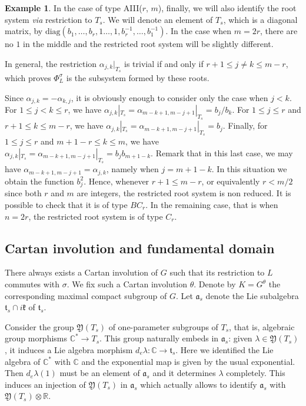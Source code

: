 \documentclass{amsart}
\theoremstyle{definition}
\newtheorem{exa}[thm]{Example}
\begin{document}
\begin{exa}
\label{exa_restricted_AIII}
In the case of type AIII($r$, $m$), finally, we will also identify the root system \emph{via}
restriction to $T_s$. We will denote an element of $T_s$, which is a diagonal matrix,  
by $\mathrm{diag}(b_1,\ldots,b_r, 1\ldots,1, b_r^{-1},\ldots,b_1^{-1})$.
In the case when $m=2r$, there are no $1$ in the middle and the restricted 
root system will be slightly different.

In general, the restriction $\alpha_{j,k}|_{T_s}$ is trivial if and only 
if $r+1\leq j\neq k\leq m-r$, which proves 
$\Phi_L^{\sigma}$ is the subsystem formed by these roots.

Since $\alpha_{j,k}=-\alpha_{k,j}$, it is obviously enough to consider 
only the case when $j<k$.
For $1\leq j<k \leq r$, we have 
$\alpha_{j,k}|_{T_s}=\alpha_{m-k+1,m-j+1}|_{T_s}=b_j/b_k$.
For $1\leq j \leq r$ and $r+1\leq k\leq m-r$, we have 
$\alpha_{j,k}|_{T_s}=\alpha_{m-k+1,m-j+1}|_{T_s}=b_j$.
Finally, for $1\leq j \leq r$ and $m+1-r\leq k\leq m$, we have 
$\alpha_{j,k}|_{T_s}=\alpha_{m-k+1,m-j+1}|_{T_s}=b_jb_{m+1-k}$.
Remark that in this last case, we may have 
$\alpha_{m-k+1,m-j+1}=\alpha_{j,k}$, namely when $j=m+1-k$. 
In this situation we obtain the 
function $b_j^2$. Hence, whenever $r+1\leq m-r$, or equivalently $r<m/2$
since both $r$ and $m$ are integers, the restricted root system is 
non reduced. It is possible to check 
that it is of type $BC_r$. In the remaining case, that is when 
$n=2r$, the restricted root system is of type $C_r$.
\end{exa}

\subsection{Cartan involution and fundamental domain}

There always exists a Cartan involution of $G$ such that its 
restriction to $L$ commutes with $\sigma$. We fix such a Cartan involution $\theta$. 
Denote by $K = G^{\theta}$ the corresponding 
maximal compact subgroup of $G$.  
Let $\mathfrak{a}_s$ denote the Lie subalgebra $\mathfrak{t}_s \cap i\mathfrak{k}$
of $\mathfrak{t}_s$.

Consider the group $\mathfrak{Y}(T_s)$ of one-parameter subgroups of $T_s$,
that is, algebraic group morphisms $\mathbb{C}^*\rightarrow T_s$.
This group naturally embeds in $\mathfrak{a}_s$: given $\lambda \in \mathfrak{Y}(T_s)$, 
it induces a Lie algebra morphism $d_e\lambda :\mathbb{C} \rightarrow \mathfrak{t}_s$.
Here we identified the Lie algebra of $\mathbb{C}^*$ with $\mathbb{C}$ and the 
exponential map is given by the usual exponential. 
Then $d_e\lambda(1)$ must be an element of $\mathfrak{a}_s$ and it determines 
$\lambda$ completely. This induces an injection of $\mathfrak{Y}(T_s)$ in 
$\mathfrak{a}_s$ which actually allows to identify $\mathfrak{a}_s$ 
with $\mathfrak{Y}(T_s)\otimes \mathbb{R}$.  
\end{document}
